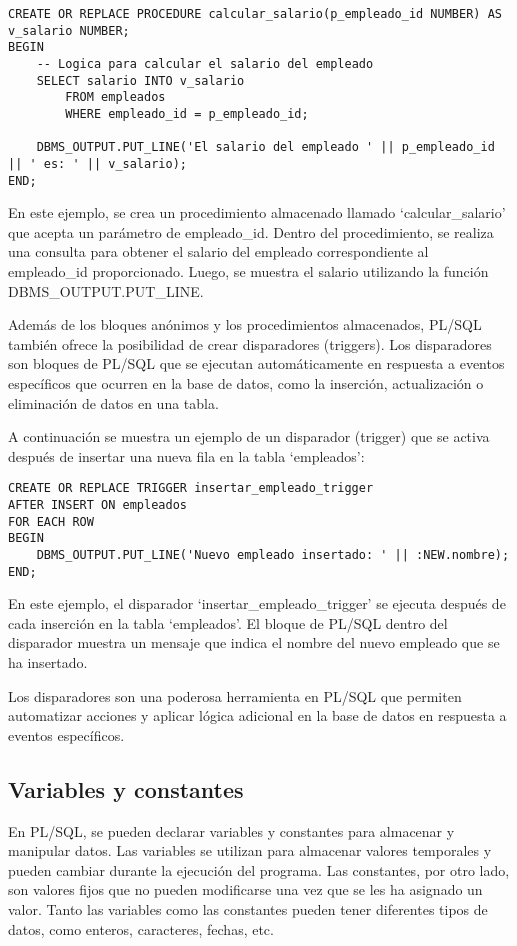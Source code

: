 \documentclass[executivepaper]{article}
\begin{document}
\begin{lstlisting}
CREATE OR REPLACE PROCEDURE calcular_salario(p_empleado_id NUMBER) AS
v_salario NUMBER;
BEGIN
    -- Logica para calcular el salario del empleado
    SELECT salario INTO v_salario
        FROM empleados
        WHERE empleado_id = p_empleado_id;

    DBMS_OUTPUT.PUT_LINE('El salario del empleado ' || p_empleado_id || ' es: ' || v_salario);
END;
\end{lstlisting}

En este ejemplo, se crea un procedimiento almacenado llamado \enquote*{calcular\_salario} que acepta un parámetro de empleado\_id. Dentro del procedimiento, se realiza una consulta para obtener el salario del empleado correspondiente al empleado\_id proporcionado. Luego, se muestra el salario utilizando la función DBMS\_OUTPUT.PUT\_LINE.

Además de los bloques anónimos y los procedimientos almacenados, PL/SQL también ofrece la posibilidad de crear disparadores (triggers). Los disparadores son bloques de PL/SQL que se ejecutan automáticamente en respuesta a eventos específicos que ocurren en la base de datos, como la inserción, actualización o eliminación de datos en una tabla.

A continuación se muestra un ejemplo de un disparador (trigger) que se activa después de insertar una nueva fila en la tabla \enquote*{empleados}:

\begin{lstlisting}
CREATE OR REPLACE TRIGGER insertar_empleado_trigger
AFTER INSERT ON empleados
FOR EACH ROW
BEGIN
    DBMS_OUTPUT.PUT_LINE('Nuevo empleado insertado: ' || :NEW.nombre);
END;
\end{lstlisting}

En este ejemplo, el disparador \enquote*{insertar\_empleado\_trigger} se ejecuta después de cada inserción en la tabla \enquote*{empleados}. El bloque de PL/SQL dentro del disparador muestra un mensaje que indica el nombre del nuevo empleado que se ha insertado.

Los disparadores son una poderosa herramienta en PL/SQL que permiten automatizar acciones y aplicar lógica adicional en la base de datos en respuesta a eventos específicos.

\subsection{Variables y constantes}
En PL/SQL, se pueden declarar variables y constantes para almacenar y manipular datos. Las variables se utilizan para almacenar valores temporales y pueden cambiar durante la ejecución del programa. Las constantes, por otro lado, son valores fijos que no pueden modificarse una vez que se les ha asignado un valor. Tanto las variables como las constantes pueden tener diferentes tipos de datos, como enteros, caracteres, fechas, etc.
\end{document}

